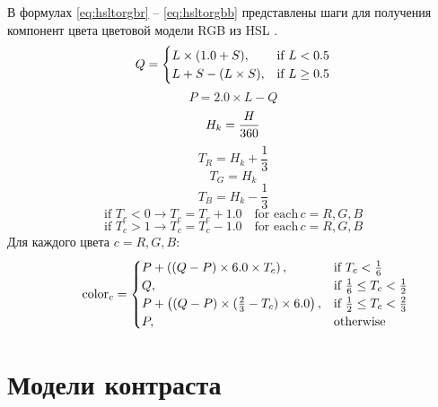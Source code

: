 В формулах \ref{eq:hsltorgbr} -- \ref{eq:hsltorgbb} представлены шаги для получения компонент цвета цветовой модели RGB из HSL \cite{hsl}.
\begin{equation}
	{\label{eq:hsltorgbr}\displaystyle Q={\begin{cases}L\times (1.0+S),&{\mbox{if }}L<0.5\\L+S-(L\times S),&{\mbox{if }}L\geq 0.5\end{cases}}}
\end{equation}
\begin{equation}
	{\displaystyle P=2.0\times L-Q}
\end{equation}
\begin{equation}
	{\displaystyle H_{k}={H \over 360}}
\end{equation}
\begin{equation}
	{\displaystyle T_{R}=H_{k}+{\frac {1}{3}}}
\end{equation}
\begin{equation}
	{\displaystyle T_{G}=H_{k}}
\end{equation}
\begin{equation}
	{\displaystyle T_{B}=H_{k}-{\frac {1}{3}}}
\end{equation}
\begin{equation}
	{\displaystyle {\mbox{if }}T_{c}<0\rightarrow T_{c}=T_{c}+1.0\quad {\mbox{for each}}\,c=R,G,B}
\end{equation}
\begin{equation}
	{\displaystyle {\mbox{if }}T_{c}>1\rightarrow T_{c}=T_{c}-1.0\quad {\mbox{for each}}\,c=R,G,B}
\end{equation}
Для каждого цвета $c = R,G,B$:
\begin{equation}
	{\label{eq:hsltorgbb}\displaystyle \qquad \mathrm {color} _{c}={\begin{cases}P+\left((Q-P)\times 6.0\times T_{c}\right),&{\mbox{if }}T_{c}<{\frac {1}{6}}\\Q,&{\mbox{if }}{\frac {1}{6}}\leq T_{c}<{\frac {1}{2}}\\P+\left((Q-P)\times ({\frac {2}{3}}-T_{c})\times 6.0\right),&{\mbox{if }}{\frac {1}{2}}\leq T_{c}<{\frac {2}{3}}\\P,&{\mbox{otherwise }}\end{cases}}}
\end{equation}

\section{Модели контраста}

